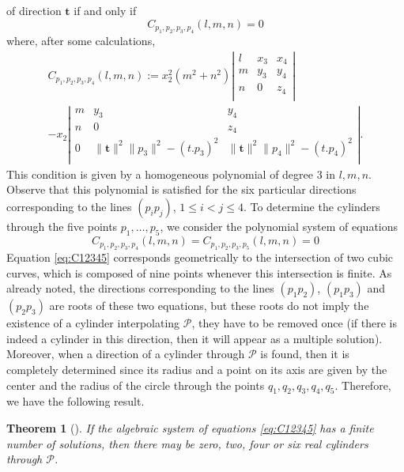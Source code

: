 \documentclass[5p]{elsarticle}
\newtheorem{thm}{Theorem}
\newcommand\Pc{\mathcal P}
\def\tg{{\mathbf{t}}}
\newcommand{\com}[1]{{\color{black} #1}}
\begin{document}
of direction $\tg$ if and only if 
$$C_{p_1,p_2,p_3,p_4}(l,m,n)=0$$ 
where, after some \com{calculations},
\begin{multline*}
C_{p_1,p_2,p_3,p_4}(l,m,n)  :=  
x_2^2(m^2+n^2)\left|
           \begin{array}{ccc}
             l & x_3 & x_4 \\
             m & y_3 & y_4 \\
             n & 0 & z_4 \\
             \end{array} \right|  \\
	    - x_2\left|
            \begin{array}{ccc}
             m & y_3 & y_4 \\
             n & 0 & z_4 \\
             0 & \|\tg\|^{2}\|p_3\|^2-(t.p_3)^2 & \|\tg\|^{2}\|p_4\|^2-(t.p_4)^2 \\
             \end{array}\right|.	
\end{multline*}
This condition is given by a homogeneous polynomial of degree 3 in $l,m,n$. Observe that \com{this polynomial} is satisfied for the six particular directions corresponding to the lines $(p_{i}p_{j})$, $1\leq i< j \leq 4$. To determine the cylinders through the five points 
$p_{1},\ldots,p_{5}$, we consider the polynomial system of equations
\begin{equation}\label{eq:C12345}
	C_{p_{1},p_{2},p_{3},p_{4}}(l,m,n)=C_{p_{1},p_{2},p_{3},p_{5}}(l,m,n)=0
\end{equation}
\com{Equation \ref{eq:C12345}} corresponds geometrically to the intersection of two cubic curves, which is composed of nine points whenever this intersection is finite. As already \com{noted}, the directions corresponding to the lines $(p_{1}p_{2})$, $(p_{1}p_{3})$ and $(p_{2}p_{3})$ are roots of these two equations, but \com{these roots} do not imply the existence of a cylinder interpolating $\Pc$, they have to be removed once (if there is indeed a cylinder in this direction, then it will appear as a multiple solution). Moreover, when a direction of a cylinder through $\Pc$ is found, then it is completely determined since its radius and a point on its axis are given by the center and the radius of the circle through the points $q_1,q_2,q_3,q_4,q_5$. Therefore, we have the following result.

\begin{thm}[\cite{Devillers02}] If the algebraic system of equations \eqref{eq:C12345} has a finite number of solutions, then there may be zero, two, four or six real cylinders through $\Pc$.	
\end{thm} 
\end{document}
